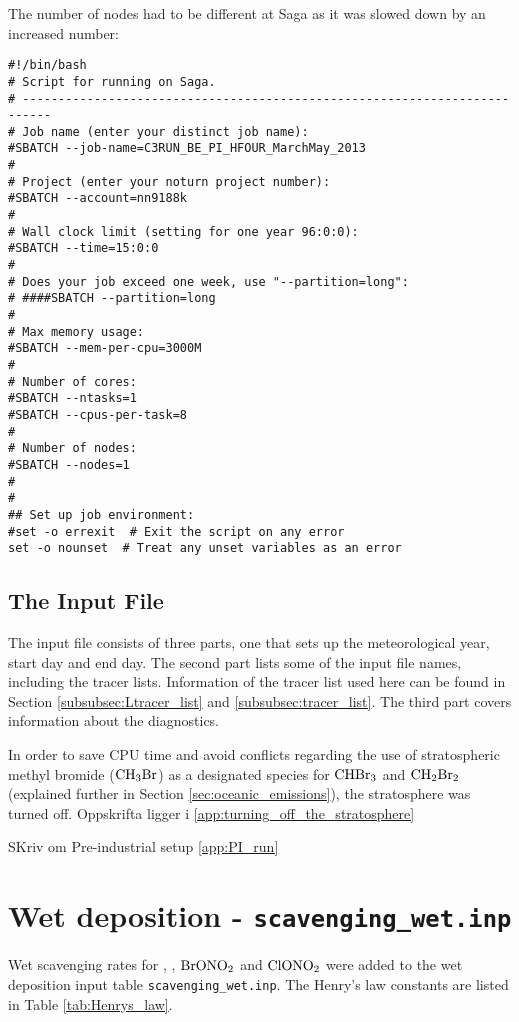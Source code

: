 The number of nodes had to be different at Saga as it was slowed down by an increased number: 

\begin{lstlisting}
#!/bin/bash
# Script for running on Saga.
# --------------------------------------------------------------------------
# Job name (enter your distinct job name):
#SBATCH --job-name=C3RUN_BE_PI_HFOUR_MarchMay_2013
#
# Project (enter your noturn project number):
#SBATCH --account=nn9188k
#
# Wall clock limit (setting for one year 96:0:0):
#SBATCH --time=15:0:0
#
# Does your job exceed one week, use "--partition=long":
# ####SBATCH --partition=long
#
# Max memory usage:
#SBATCH --mem-per-cpu=3000M
#
# Number of cores:
#SBATCH --ntasks=1
#SBATCH --cpus-per-task=8
#
# Number of nodes:
#SBATCH --nodes=1
#
#
## Set up job environment:
#set -o errexit  # Exit the script on any error
set -o nounset  # Treat any unset variables as an error
\end{lstlisting}


\subsection{The Input File}

The input file consists of three parts, one that sets up the meteorological year, start day and end day. The second part lists some of the input file names, including the tracer lists. Information of the tracer list used here can be found in Section \ref{subsubsec:Ltracer_list} and \ref{subsubsec:tracer_list}. The third part covers information about the diagnostics. 

In order to save CPU time and avoid conflicts regarding the use of stratospheric methyl bromide ($\mathrm{CH_3Br}$) as a designated species for $\mathrm{CHBr_3}$ and $\mathrm{CH_2Br_2}$ (explained further in Section \ref{sec:oceanic_emissions}), the stratosphere was turned off. Oppskrifta ligger i \ref{app:turning_off_the_stratosphere}

SKriv om Pre-industrial setup \ref{app:PI_run}


\section{Wet deposition - \texttt{scavenging\_wet.inp}}\label{sec:scav_wet}

Wet scavenging rates for , , $\mathrm{BrONO_2}$ and $\mathrm{ClONO_2}$ were added to the wet deposition input table \texttt{scavenging\_wet.inp}. The Henry's law constants are listed in Table \ref{tab:Henrys_law}. 

